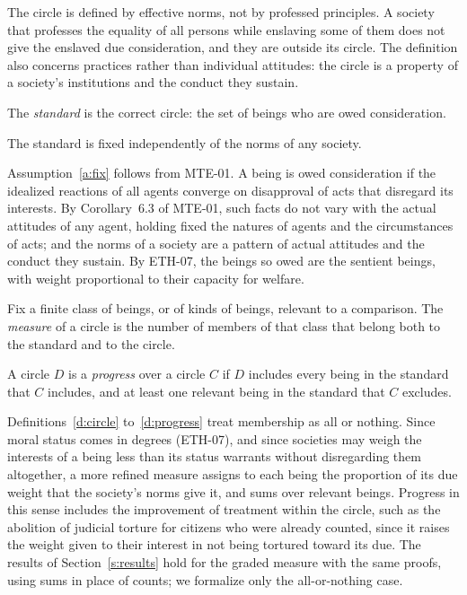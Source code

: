 \documentclass{situationist-preprint}
\begin{document}
The circle is defined by effective norms, not by professed principles. A society that professes the equality of all persons while enslaving some of them does not give the enslaved due consideration, and they are outside its circle. The definition also concerns practices rather than individual attitudes: the circle is a property of a society's institutions and the conduct they sustain.

\begin{definition}\label{d:std}
The \emph{standard} is the correct circle: the set of beings who are owed consideration.
\end{definition}

\begin{assumption}[Fixity]\label{a:fix}
The standard is fixed independently of the norms of any society.
\end{assumption}

Assumption~\ref{a:fix} follows from MTE-01. A being is owed consideration if the idealized reactions of all agents converge on disapproval of acts that disregard its interests. By Corollary~6.3 of MTE-01, such facts do not vary with the actual attitudes of any agent, holding fixed the natures of agents and the circumstances of acts; and the norms of a society are a pattern of actual attitudes and the conduct they sustain. By ETH-07, the beings so owed are the sentient beings, with weight proportional to their capacity for welfare.

\begin{definition}[Measure]\label{d:measure}
Fix a finite class of beings, or of kinds of beings, relevant to a comparison. The \emph{measure} of a circle is the number of members of that class that belong both to the standard and to the circle.
\end{definition}

\begin{definition}[Progress]\label{d:progress}
A circle $D$ is a \emph{progress} over a circle $C$ if $D$ includes every being in the standard that $C$ includes, and at least one relevant being in the standard that $C$ excludes.
\end{definition}

\begin{remark}\label{r:graded}
Definitions~\ref{d:circle} to~\ref{d:progress} treat membership as all or nothing. Since moral status comes in degrees (ETH-07), and since societies may weigh the interests of a being less than its status warrants without disregarding them altogether, a more refined measure assigns to each being the proportion of its due weight that the society's norms give it, and sums over relevant beings. Progress in this sense includes the improvement of treatment within the circle, such as the abolition of judicial torture for citizens who were already counted, since it raises the weight given to their interest in not being tortured toward its due. The results of Section~\ref{s:results} hold for the graded measure with the same proofs, using sums in place of counts; we formalize only the all-or-nothing case.
\end{remark}
\end{document}

